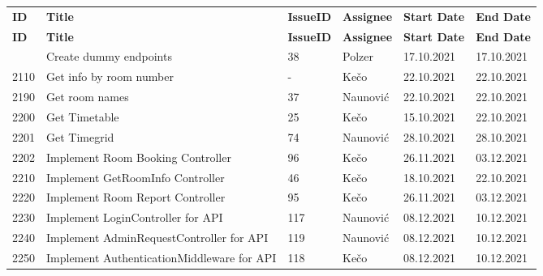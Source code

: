 \begin{longtable}{|p{}|p{}|p{}|p{}|p{}|p{}|} \hline
    \textbf{ID} & \textbf{Title} & \textbf{Issue\-ID} & \textbf{Assignee} & \textbf{Start Date} & \textbf{End \linebreak Date} \\ \hhline{|=|=|=|=|=|=|}
    \endfirsthead
    \hline
    \textbf{ID} & \textbf{Title} & \textbf{Issue\-ID} & \textbf{Assignee} & \textbf{Start Date} & \textbf{End \linebreak Date} \\ \hhline{|=|=|=|=|=|=|}
    \endhead
    2100 & Create dummy endpoints & 38 & Polzer & 17.10.2021 & 17.10.2021 \\ \hline
    2110 & Get info by room number & - & Kečo & 22.10.2021 & 22.10.2021 \\ \hline
    2190 & Get room names & 37 & Naunović & 22.10.2021 & 22.10.2021 \\ \hline
    2200 & Get Timetable & 25 & Kečo & 15.10.2021 & 22.10.2021 \\ \hline
    2201 & Get Timegrid & 74 & Naunović & 28.10.2021 & 28.10.2021 \\ \hline
    2202 & Implement Room Booking Controller & 96 & Kečo & 26.11.2021 & 03.12.2021 \\ \hline
    2210 & Implement GetRoomInfo Controller & 46 & Kečo & 18.10.2021 & 22.10.2021 \\ \hline
    2220 & Implement Room Report Controller & 95 & Kečo & 26.11.2021 & 03.12.2021 \\ \hline
    2230 & Implement LoginController for API & 117 & Naunović & 08.12.2021 & 10.12.2021 \\ \hline
    2240 & Implement AdminRequestController for API & 119 & Naunović & 08.12.2021 & 10.12.2021 \\ \hline
    2250 & Implement AuthenticationMiddleware for API & 118 & Kečo & 08.12.2021 & 10.12.2021 \\ \hline
\end{longtable}


